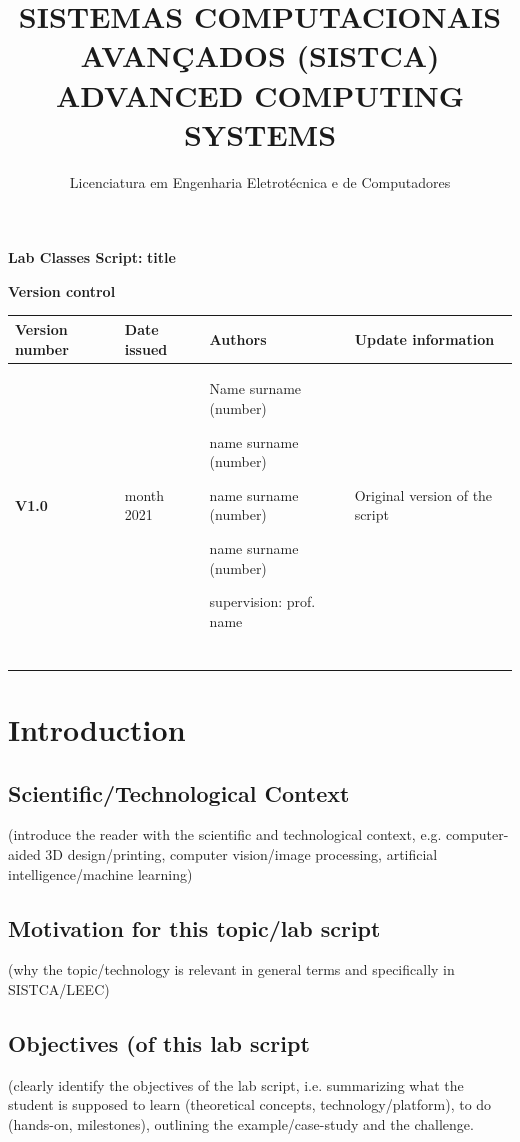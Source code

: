\documentclass{article}
\title{\textbf{SISTEMAS COMPUTACIONAIS AVANÇADOS (SISTCA)
ADVANCED COMPUTING SYSTEMS}}
\author{Licenciatura em Engenharia Eletrotécnica e de Computadores}
\date{Instituto Superior de Engenharia do Porto 

Politécnico do Porto}
\begin{document}
\maketitle
\vspace{10cm}
\textbf{Lab Classes Script: }
\textbf{title}

\newpage

\textbf{Version control}
\vspace{1cm}


\begin{tabular}[h!]{|p{1.5cm}|p{1.5cm}|p{5cm}|p{4cm}|}
\hline
  \textbf{Version number}   & \textbf{Date issued} & \textbf{Authors} & \textbf{Update information} \\
  \hline
   \textbf{V1.0}  & month 2021 & Name surname (number) 
   
   name surname (number) 
   
   name surname (number) 
   
   name surname (number) 
   
   supervision: prof. name & Original version of the script \\
   \hline
   & & & \\
   \hline
   & & & \\
   \hline
   & & & \\
   \hline
   & & & \\
   \hline
\end{tabular}

\newpage

\tableofcontents
\newpage



\section{Introduction}
\subsection{Scientific/Technological Context}
(introduce the reader with the scientific and technological context, e.g. computer-aided 3D design/printing, computer vision/image processing, artificial intelligence/machine learning)
\subsection{Motivation for this topic/lab script}
(why the topic/technology is relevant in general terms and specifically in SISTCA/LEEC)
\subsection{Objectives (of this lab script}
(clearly identify the objectives of the lab script, i.e. summarizing what the student is supposed to learn (theoretical concepts, technology/platform), to do (hands-on, milestones), outlining the example/case-study and the challenge.
\end{document}
